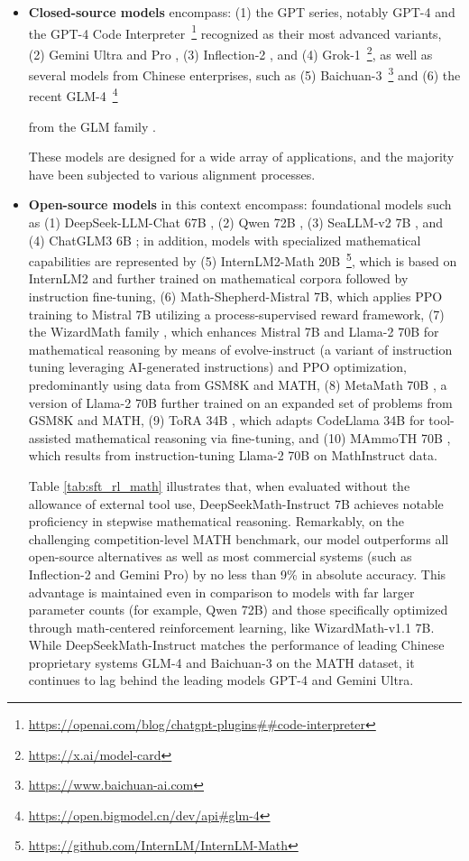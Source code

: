 \begin{itemize}[topsep=0pt]
\begin{itemize}[topsep=0pt]
    \item \textbf{Closed-source models} encompass: (1) the GPT series, notably GPT-4 \citep{gpt4} and the GPT-4 Code Interpreter~\footnote{\url{https://openai.com/blog/chatgpt-plugins\#\#code-interpreter}} recognized as their most advanced variants, (2) Gemini Ultra and Pro \citep{gemini}, (3) Inflection-2 \citep{inflection-2}, and (4) Grok-1~\footnote{\url{https://x.ai/model-card}}, as well as several models from Chinese enterprises, such as (5) Baichuan-3~\footnote{\url{https://www.baichuan-ai.com}} and (6) the recent GLM-4~\footnote{\url{https://open.bigmodel.cn/dev/api\#glm-4}}

    from the GLM family \citep{glm}.

These models are designed for a wide array of applications, and the majority have been subjected to various alignment processes.

\item \textbf{Open-source models} in this context encompass: foundational models such as (1) DeepSeek-LLM-Chat 67B \citep{deepseek-llm}, (2) Qwen 72B \citep{qwen}, (3) SeaLLM-v2 7B \citep{seallm}, and (4) ChatGLM3 6B \citep{chatglm3}; in addition, models with specialized mathematical capabilities are represented by (5) InternLM2-Math 20B~\footnote{\url{https://github.com/InternLM/InternLM-Math}}, which is based on InternLM2 and further trained on mathematical corpora followed by instruction fine-tuning, (6) Math-Shepherd-Mistral 7B, which applies PPO training \citep{schulman2017proximal} to Mistral 7B \citep{mistral} utilizing a process-supervised reward framework, (7) the WizardMath family \citep{wizardmath}, which enhances Mistral 7B and Llama-2 70B \citep{llama2} for mathematical reasoning by means of evolve-instruct (a variant of instruction tuning leveraging AI-generated instructions) and PPO optimization, predominantly using data from GSM8K and MATH, (8) MetaMath 70B \citep{metamath}, a version of Llama-2 70B further trained on an expanded set of problems from GSM8K and MATH, (9) ToRA 34B \cite{tora}, which adapts CodeLlama 34B for tool-assisted mathematical reasoning via fine-tuning, and (10) MAmmoTH 70B \citep{MathInstruct}, which results from instruction-tuning Llama-2 70B on MathInstruct data.

Table \ref{tab:sft_rl_math} illustrates that, when evaluated without the allowance of external tool use, DeepSeekMath-Instruct 7B achieves notable proficiency in stepwise mathematical reasoning. Remarkably, on the challenging competition-level MATH benchmark, our model outperforms all open-source alternatives as well as most commercial systems (such as Inflection-2 and Gemini Pro) by no less than 9\% in absolute accuracy. This advantage is maintained even in comparison to models with far larger parameter counts (for example, Qwen 72B) and those specifically optimized through math-centered reinforcement learning, like WizardMath-v1.1 7B. While DeepSeekMath-Instruct matches the performance of leading Chinese proprietary systems GLM-4 and Baichuan-3 on the MATH dataset, it continues to lag behind the leading models GPT-4 and Gemini Ultra.


\end{itemize}
\end{itemize}
